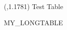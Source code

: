 \documentclass{article} %
\newcommand*{\subsectionspacebefore}{8pt}
\begin{document}



\begin{textblock}{7.3}({\LEFTMARGIN},1.1781) %
\A
\color{regulargrey}
Test Table


\vspace{\subsectionspacebefore}


MY_LONGTABLE

\end{textblock}
\end{document}
